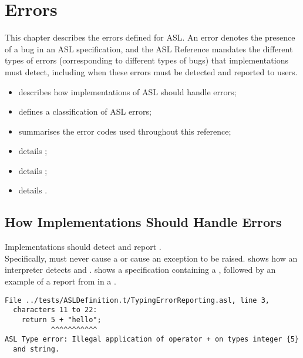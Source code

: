 \chapter{Errors\label{chap:Errors}}

This chapter describes the errors defined for ASL.
%
An error denotes the presence of a bug in an ASL specification,
and the ASL Reference mandates the different types of errors
(corresponding to different types of bugs) that implementations must detect,
including when these errors must be detected and reported to users.

\ChapterOutline
\begin{itemize}
  \item {} describes how implementations of ASL
        should handle errors;
  \item {} defines a classification of ASL errors;
  \item {} summarises the error codes used throughout this reference;
  \item {} details \builderrorsterm;
  \item {} details \typingerrorsterm;
  \item {} details \dynamicerrorsterm.
\end{itemize}

\section{How Implementations Should Handle Errors\label{sec:How Implementations Should Handle Errors}}

 Implementations should detect and report \staticerrorsterm. \\
Specifically, \staticerrorsterm{} must never cause a \dynamicerrorterm{} or
cause an exception to be raised.
%
 shows how an interpreter detects \builderrorsterm{}
and \typingerrorsterm{}.
%
 shows a specification containing a \typingerrorterm,
followed by an example of a report from \aslref{} in a \linuxbashshell.

\begin{Verbatim}[fontsize=\footnotesize, frame=single]
File ../tests/ASLDefinition.t/TypingErrorReporting.asl, line 3,
  characters 11 to 22:
    return 5 + "hello";
           ^^^^^^^^^^^
ASL Type error: Illegal application of operator + on types integer {5}
  and string.
\end{Verbatim}

